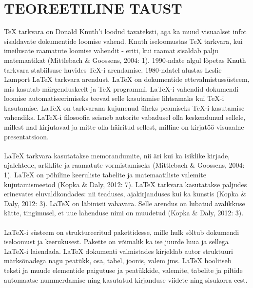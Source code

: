 \documentclass{21kuur}
\begin{document}
\chapter{TEOREETILINE TAUST}
TeX tarkvara on Donald Knuth'i loodud tavateksti, aga ka muud visuaalset infot sisaldavate dokumentide loomise vahend. Knuth iseloomustas TeX tarkvara, kui imeilusate raamatute loomise vahendit - eriti, kui raamat sisaldab palju matemaatikat (Mittlebach \& Goossens, 2004: 1). 1990-ndate algul lõpetas Knuth tarkvara stabiilsuse huvides TeX-i arendamise. 1980-ndatel alustas Leslie Lamport LaTeX tarkvara arendust. LaTeX on dokumentide ettevalmistussüsteem, mis kasutab märgenduskeelt ja TeX programmi. LaTeX-i vahendid dokumendi loomise automatiseerimiseks teevad selle kasutamise lihtsamaks kui TeX-i kasutamise. LaTeX on tarkvarana kujunenud üheks peamiseks TeX-i kasutamise vahendiks. LaTeX-i filosoofia seisneb autorite vabadusel olla keskendunud sellele, millest nad kirjutavad ja mitte olla häiritud sellest, milline on kirjatöö visuaalne presentatsioon. 
\\\\LaTeX tarkvara kasutatakse memorandumite, nii äri kui ka isiklike kirjade, ajalehtede, artiklite ja raamatute vormistamiseks (Mittlebach \& Goossens, 2004: 1). LaTeX on põhiline keeruliste tabelite ja matemaatiliste valemite kujutamismeetod (Kopka \& Daly, 2012: 7). LaTeX tarkvara kasutatakse paljudes erinevates eluvaldkondades: nii teaduses, ajakirjanduses kui ka kunstis (Kopka \& Daly, 2012: 3). LaTeX on läbinisti vabavara. Selle arendus on lubatud avalikkuse kätte, tingimusel, et uue lahenduse nimi on muudetud (Kopka \& Daly, 2012: 3). 
\\\\LaTeX-i süsteem on struktureeritud pakettidesse, mille hulk sõltub dokumendi iseloomust ja keerukusest. Pakette on võimalik ka ise juurde luua ja sellega LaTeX-i laiendada. LaTeX dokumenti valmistades kirjeldab autor struktuuri märksõnadega nagu peatükk, osa, tabel, joonis, valem jms. LaTeX hoolitseb teksti ja muude elementide paigutuse ja peatükkide, valemite, tabelite ja piltide automaatse nummerdamise ning kasutatud kirjanduse viidete ning sisukorra eest.
\end{document}

